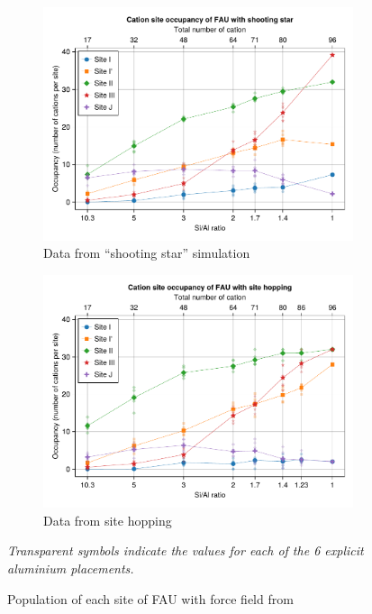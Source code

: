 \documentclass[main.tex]{subfiles}
\begin{document}
\begin{figure}
	\centering
	\begin{subfigure}{0.9\linewidth}
		\centering
		\includegraphics[width=\linewidth]{figures/cations/directsite_FAU.pdf}
		\caption{Data from ``shooting star'' simulation}\label{fig:directsiteFAU}
	\end{subfigure}

	\begin{subfigure}{0.9\linewidth}
		\centering
		\includegraphics[width=\linewidth]{figures/cations/sitehopping_FAU.pdf}
		\caption{Data from site hopping}\label{fig:sitehoppingFAU}
	\end{subfigure}

	\caption{Population of each site of FAU with force field from \textcite{BoulfelfelSholl2021}}
	
	\sl Transparent symbols indicate the values for each of the 6 explicit aluminium placements.
\end{figure}
\end{document}
